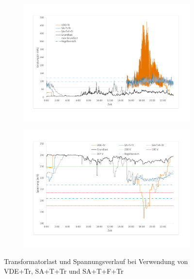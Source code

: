 \begin{figure}
	\begin{subfigure}{\linewidth}
		\includegraphics[scale=0.45]{img/mitTrafo/Trafolast2.pdf}
        \label{ABB_mT_Trafo}
	\end{subfigure}
	\begin{subfigure}{\linewidth}
		\includegraphics[scale=0.45]{img/mitTrafo/Spannung2.pdf}
        \label{ABB_mT_Spannung}
	\end{subfigure}
	\caption{Transformatorlast und Spannungsverlauf bei Verwendung von VDE+Tr, SA+T+Tr und SA+T+F+Tr}
\end{figure}
